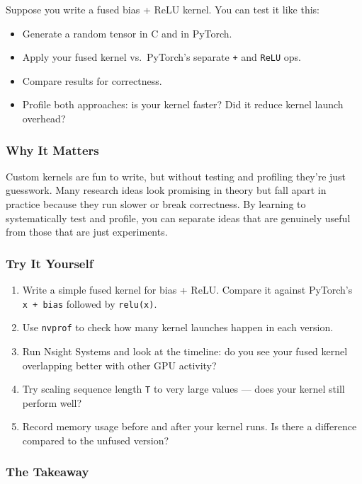\documentclass[
  letterpaper,
  DIV=11,
  numbers=noendperiod]{scrreprt}
\providecommand{\tightlist}{%
  \setlength{\itemsep}{0pt}\setlength{\parskip}{0pt}}
\begin{document}
Suppose you write a fused bias + ReLU kernel. You can test it like this:

\begin{itemize}
\tightlist
\item
  Generate a random tensor in C and in PyTorch.
\item
  Apply your fused kernel vs.~PyTorch's separate \texttt{+} and
  \texttt{ReLU} ops.
\item
  Compare results for correctness.
\item
  Profile both approaches: is your kernel faster? Did it reduce kernel
  launch overhead?
\end{itemize}

\subsubsection{Why It Matters}\label{why-it-matters-60}

Custom kernels are fun to write, but without testing and profiling
they're just guesswork. Many research ideas look promising in theory but
fall apart in practice because they run slower or break correctness. By
learning to systematically test and profile, you can separate ideas that
are genuinely useful from those that are just experiments.

\subsubsection{Try It Yourself}\label{try-it-yourself-74}

\begin{enumerate}
\def\labelenumi{\arabic{enumi}.}
\tightlist
\item
  Write a simple fused kernel for bias + ReLU. Compare it against
  PyTorch's \texttt{x\ +\ bias} followed by \texttt{relu(x)}.
\item
  Use \texttt{nvprof} to check how many kernel launches happen in each
  version.
\item
  Run Nsight Systems and look at the timeline: do you see your fused
  kernel overlapping better with other GPU activity?
\item
  Try scaling sequence length \texttt{T} to very large values --- does
  your kernel still perform well?
\item
  Record memory usage before and after your kernel runs. Is there a
  difference compared to the unfused version?
\end{enumerate}

\subsubsection{The Takeaway}\label{the-takeaway-75}
\end{document}

